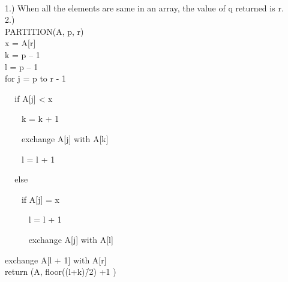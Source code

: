 \documentclass[addpoints,11pt]{exam}
\begin{document}
\begin{questions}
		\begin{solutionorbox}\\
			1.) When all the elements are same in an array, the value of q returned is r.\\
			
			2.) \\
			PARTITION(A, p, r) \\
			x = A[r]\\
			k = p – 1\\
			l = p – 1\\
			for j = p to r - 1
			
			$\hspace{10pt}$	 if A[j] < x
			
			$\hspace{10pt}$$\hspace{10pt}$		k = k + 1
			
			$\hspace{10pt}$$\hspace{10pt}$	exchange A[j] with A[k]
			
			$\hspace{10pt}$$\hspace{10pt}$		l = l + 1
			
			$\hspace{10pt}$  	else
			
			$\hspace{10pt}$$\hspace{10pt}$		if A[j] = x
			
			$\hspace{10pt}$$\hspace{10pt}$$\hspace{10pt}$ l = l + 1
			
			$\hspace{10pt}$$\hspace{10pt}$$\hspace{10pt}$ exchange A[j] with A[l]
			
			exchange A[l + 1] with A[r]\\
			return (A, floor((l+k)݇/2) +1 )\\
			
		\end{solutionorbox}
		
		\ifprintanswers
		\newpage
		\else
		\bigskip
		\fi
		
		
		

\end{questions}
\end{document}
